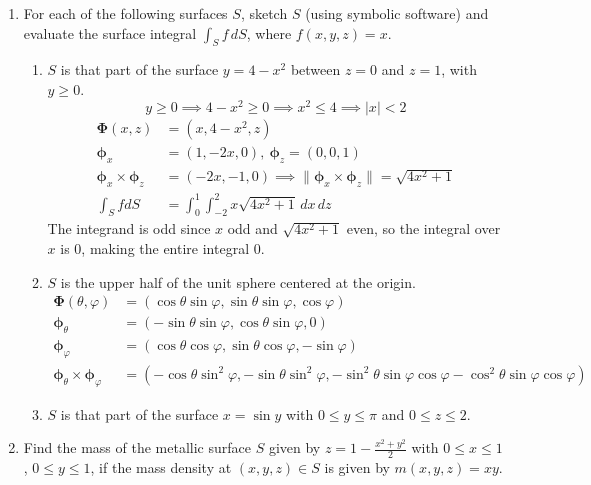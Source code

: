 \documentclass{article}
\newcommand{\norm}[1]{\| #1 \|}
\begin{document}
\begin{enumerate}
\begin{enumerate}
    \end{enumerate}
    \item For each of the following surfaces $S$, sketch $S$ (using symbolic software) and evaluate the surface integral $\int_S f \, dS$, where $f(x,y,z) = x$.
    \begin{enumerate}
        \item $S$ is that part of the surface $y=4-x^2$ between $z = 0$ and $z = 1$, with $y\geq 0$.
        \[ y \geq 0 \implies 4 - x^2 \geq 0 \implies x^2 \leq 4 \implies |x| < 2 \]
        \begin{align*}
                \boldsymbol \Phi (x,z) &= (x, 4-x^2, z) \\
                \boldsymbol \phi_x &= (1,-2x,0) ,\: \boldsymbol \phi_z = (0,0,1) \\
                \boldsymbol \phi_x \times \boldsymbol \phi_z &= (-2x, -1, 0) \implies \norm{\boldsymbol \phi_x \times \boldsymbol \phi_z} = \sqrt{4x^2 + 1} \\
                \int_S fdS &= \int_0^1\int_{-2}^{2}x\sqrt{4x^2 + 1}\, dx\, dz
        \end{align*}
        The integrand is odd since $x$ odd and $\sqrt{4x^2 + 1}$ even, so the integral over $x$ is 0, making the entire integral 0.
        \item $S$ is the upper half of the unit sphere centered at the origin.
        \begin{align*}
            \boldsymbol \Phi (\theta, \varphi) &= (\cos \theta \sin \varphi, \sin \theta \sin \varphi, \cos \varphi) \\
            \boldsymbol \phi_\theta &= (- \sin \theta \sin \varphi, \cos \theta \sin \varphi, 0) \\
            \boldsymbol \phi_\varphi &= ( \cos \theta \cos \varphi, \sin \theta \cos \varphi, -\sin \varphi) \\
            \boldsymbol \phi_\theta \times \boldsymbol \phi_\varphi &= (-\cos\theta \sin^2\varphi, -\sin\theta \sin^2\varphi, - \sin^2\theta \sin\varphi \cos\varphi - \cos^2\theta \sin \varphi \cos \varphi)
        \end{align*} 
        \item $S$ is that part of the surface $x = \sin y$ with $0 \leq y \leq \pi$ and $0 \leq z \leq 2$.
    \end{enumerate}

    \item Find the mass of the metallic surface $S$ given by $\displaystyle z = 1 - \frac{x^2 + y^2}{2}$ with $0 \leq x \leq 1$, $0 \leq y \leq 1$, if the mass density at $(x,y,z) \in S$ is given by $m(x,y,z) = xy$.
\end{enumerate}
\end{document}
